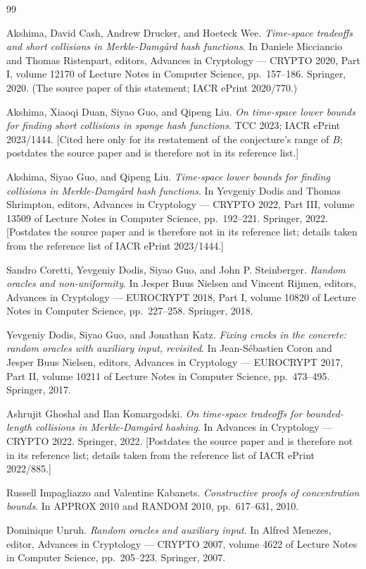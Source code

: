 \documentclass{aicr-conjecture}
\begin{document}
\begin{aicrbibliography}{99}

Akshima, David Cash, Andrew Drucker, and Hoeteck Wee.
\emph{Time-space tradeoffs and short collisions in Merkle-Damg\aa{}rd
hash functions}.
In Daniele Micciancio and Thomas Ristenpart, editors, Advances in
Cryptology --- CRYPTO 2020, Part I, volume 12170 of Lecture Notes in
Computer Science, pp.\ 157--186. Springer, 2020. (The source paper of
this statement; IACR ePrint 2020/770.)

Akshima, Xiaoqi Duan, Siyao Guo, and Qipeng Liu.
\emph{On time-space lower bounds for finding short collisions in sponge
hash functions}.
TCC 2023; IACR ePrint 2023/1444. [Cited here only for its restatement
of the conjecture's range of $B$; postdates the source paper and is
therefore not in its reference list.]

Akshima, Siyao Guo, and Qipeng Liu.
\emph{Time-space lower bounds for finding collisions in
Merkle-Damg\aa{}rd hash functions}.
In Yevgeniy Dodis and Thomas Shrimpton, editors, Advances in Cryptology
--- CRYPTO 2022, Part III, volume 13509 of Lecture Notes in Computer
Science, pp.\ 192--221. Springer, 2022. [Postdates the source paper and
is therefore not in its reference list; details taken from the
reference list of IACR ePrint 2023/1444.]

Sandro Coretti, Yevgeniy Dodis, Siyao Guo, and John P. Steinberger.
\emph{Random oracles and non-uniformity}.
In Jesper Buus Nielsen and Vincent Rijmen, editors, Advances in
Cryptology --- EUROCRYPT 2018, Part I, volume 10820 of Lecture Notes in
Computer Science, pp.\ 227--258. Springer, 2018.

Yevgeniy Dodis, Siyao Guo, and Jonathan Katz.
\emph{Fixing cracks in the concrete: random oracles with auxiliary
input, revisited}.
In Jean-S\'{e}bastien Coron and Jesper Buus Nielsen, editors, Advances
in Cryptology --- EUROCRYPT 2017, Part II, volume 10211 of Lecture
Notes in Computer Science, pp.\ 473--495. Springer, 2017.

Ashrujit Ghoshal and Ilan Komargodski.
\emph{On time-space tradeoffs for bounded-length collisions in
Merkle-Damg\aa{}rd hashing}.
In Advances in Cryptology --- CRYPTO 2022. Springer, 2022. [Postdates
the source paper and is therefore not in its reference list; details
taken from the reference list of IACR ePrint 2022/885.]

Russell Impagliazzo and Valentine Kabanets.
\emph{Constructive proofs of concentration bounds}.
In APPROX 2010 and RANDOM 2010, pp.\ 617--631, 2010.

Dominique Unruh.
\emph{Random oracles and auxiliary input}.
In Alfred Menezes, editor, Advances in Cryptology --- CRYPTO 2007,
volume 4622 of Lecture Notes in Computer Science, pp.\ 205--223.
Springer, 2007.

\end{aicrbibliography}
\end{document}
